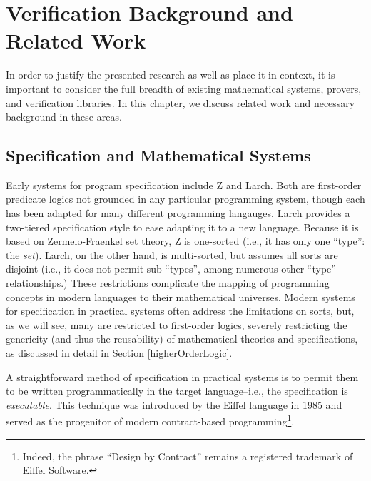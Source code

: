 \chapter{Verification Background and Related Work}\label{ch:background}

In order to justify the presented research as well as place it in context, it is important to consider the full breadth of existing mathematical systems, provers, and verification libraries.  In this chapter, we discuss related work and necessary background in these areas.

\section{Specification and Mathematical Systems}\label{sec:overviewSpec}
Early systems for program specification include Z\cite{dillerZ} and Larch\cite{guttagLarch}.  Both are first-order predicate logics not grounded in any particular programming system, though each has been adapted for many different programming langauges.  Larch provides a two-tiered specification style to ease adapting it to a new language.  Because it is based on Zermelo-Fraenkel set theory, Z is one-sorted (i.e., it has only one ``type'': the \emph{set}).  Larch, on the other hand, is multi-sorted, but assumes all sorts are disjoint (i.e., it does not permit sub-``types'', among numerous other ``type'' relationships.)  These restrictions complicate the mapping of programming concepts in modern languages to their mathematical universes.  Modern systems for specification in practical systems often address the limitations on sorts, but, as we will see, many are restricted to first-order logics, severely restricting the genericity (and thus the reusability) of mathematical theories and specifications, as discussed in detail in Section \ref{higherOrderLogic}.

A straightforward method of specification in practical systems is to permit them to be written programmatically in the target language--i.e., the specification is \emph{executable}.  This technique was introduced by the Eiffel language\cite{meyer1988eiffel} in 1985 and served as the progenitor of modern contract-based programming\footnote{Indeed, the phrase ``Design by Contract'' remains a registered trademark of Eiffel Software.}.

